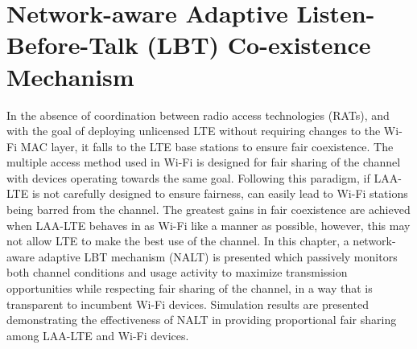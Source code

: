%
%
%


\chapter{Network-aware Adaptive Listen-Before-Talk (LBT) Co-existence Mechanism}
\label{intro-NALT} %



In the absence of coordination between radio access technologies (RATs), and with the goal of deploying unlicensed LTE without requiring changes to the Wi-Fi MAC layer, it falls to the LTE base stations to ensure fair coexistence. The multiple access method used in Wi-Fi is designed for fair sharing of the channel with devices operating towards the same goal. Following this paradigm, if LAA-LTE is not carefully designed to ensure fairness, can easily lead to Wi-Fi stations being barred from the channel. The greatest gains in fair coexistence are achieved when LAA-LTE behaves in as Wi-Fi like a manner as possible, however, this may not allow LTE to make the best use of the channel.  In this chapter, a network-aware adaptive LBT mechanism (NALT) is presented which passively monitors both channel conditions and usage activity to maximize transmission opportunities while respecting fair sharing of the channel, in a way that is transparent to incumbent Wi-Fi devices. Simulation results are presented demonstrating the effectiveness of NALT in providing proportional fair sharing among LAA-LTE and Wi-Fi devices.

